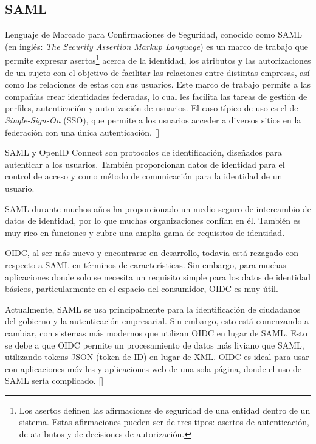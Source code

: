 \subsection{SAML}
Lenguaje de Marcado para Confirmaciones de Seguridad, conocido como SAML (en inglés: \textit{The Security Assertion Markup Language}) es un marco de trabajo que permite expresar asertos\footnote{ Los asertos definen las afirmaciones de seguridad de una entidad dentro de un sistema. Estas afirmaciones pueden ser de tres tipos: asertos de autenticación, de atributos y de decisiones de autorización.} acerca de la identidad, los atributos y las autorizaciones de un sujeto con el objetivo de facilitar las relaciones entre distintas empresas, así como las relaciones de estas con sus usuarios. Este marco de trabajo permite a las compañías crear identidades federadas, lo cual les facilita las tareas de gestión de perfiles, autenticación y autorización de usuarios. El caso típico de uso es el de \textit{Single-Sign-On }(SSO), que permite a los usuarios acceder a diversos sitios en la federación con una única autenticación. [\cite{sanchez2009estudio}]

SAML y OpenID Connect son protocolos de identificación, diseñados para autenticar a los usuarios. También proporcionan datos de identidad para el control de acceso y como método de comunicación para la identidad de un usuario.

SAML durante muchos años ha proporcionado un medio seguro de intercambio de datos de identidad, por lo que muchas organizaciones confían en él. También es muy rico en funciones y cubre una amplia gama de requisitos de identidad.


OIDC, al ser más nuevo y encontrarse en desarrollo, todavía está rezagado con respecto a SAML en términos de características. Sin embargo, para muchas aplicaciones donde solo se necesita un requisito simple para los datos de identidad básicos, particularmente en el espacio del consumidor, OIDC es muy útil.

Actualmente, SAML se usa principalmente para la identificación de ciudadanos del gobierno y la autenticación empresarial. Sin embargo, esto está comenzando a cambiar, con sistemas más modernos que utilizan OIDC en lugar de SAML. Esto se debe a que OIDC permite un procesamiento de datos más liviano que SAML, utilizando tokens JSON (token de ID) en lugar de XML. OIDC es ideal para usar con aplicaciones móviles y aplicaciones web de una sola página, donde el uso de SAML sería complicado. [\cite{naik2017securing}]

